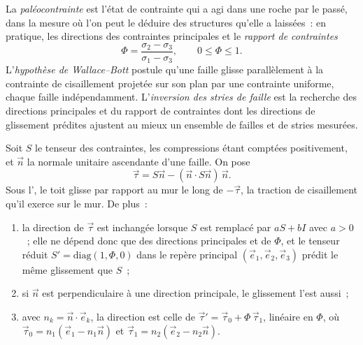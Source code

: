 \begin{definition}\label{def:b3:structural-analysis:palaeostress}
La \emph{paléocontrainte} est l'état de contrainte qui a agi
dans une roche par le passé, dans la mesure où l'on peut le déduire des structures qu'elle a laissées~:
en pratique, les directions des contraintes principales et le
\emph{rapport de contraintes}
\[
  \Phi = \frac{\sigma_2 - \sigma_3}{\sigma_1 - \sigma_3}, \qquad 0 \le \Phi
  \le 1 .
\]
L'\emph{hypothèse de Wallace--Bott} postule
qu'une faille glisse parallèlement à la contrainte de cisaillement projetée sur son plan par une
contrainte uniforme, chaque faille indépendamment. L'\emph{inversion des stries de
faille} est la recherche des directions principales
et du rapport de contraintes dont les directions de glissement prédites ajustent au mieux un ensemble de
failles et de stries mesurées.
\end{definition}

\begin{theorem}\label{thm:b3:structural-analysis:wallace-bott}
Soit $S$ le tenseur des contraintes, les compressions étant comptées positivement, et $\vec n$ la
normale unitaire ascendante d'une faille. On pose
\[
  \vec\tau = S\vec n - (\vec n\cdot S\vec n)\,\vec n .
\]
Sous l', le toit glisse par rapport au
mur le long de $-\vec\tau$, la traction de cisaillement qu'il exerce sur le
mur. De plus~:
\begin{enumerate}[label=(\alph*)]
  \item la direction de $\vec\tau$ est inchangée lorsque $S$ est remplacé par $aS +
        bI$ avec $a > 0$~; elle ne dépend donc que des directions principales et de $\Phi$, et le
        tenseur réduit $S' =
        \mathrm{diag}(1, \Phi, 0)$ dans le repère principal $(\vec e_1, \vec
        e_2, \vec e_3)$ prédit le même glissement que $S$~;
  \item si $\vec n$ est perpendiculaire à une direction principale,
        le glissement l'est aussi~;
  \item avec $n_k = \vec n\cdot\vec e_k$, la direction est celle de $\vec\tau'
        = \vec\tau_0 + \Phi\,\vec\tau_1$, linéaire en $\Phi$, où $\vec\tau_0
        = n_1(\vec e_1 - n_1\vec n)$ et $\vec\tau_1 = n_2(\vec e_2 - n_2\vec
        n)$.
\end{enumerate}
\end{theorem}

